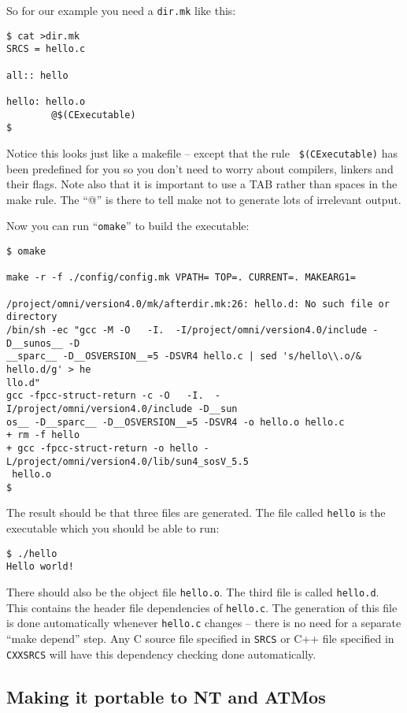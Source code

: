 \documentclass[11pt]{article}
\begin{document}
So for our example you need a {\tt dir.mk} like this:

\begin{verbatim}
$ cat >dir.mk
SRCS = hello.c

all:: hello

hello: hello.o
        @$(CExecutable)
$
\end{verbatim}

Notice this looks just like a makefile -- except that the rule {\tt
\$(CExecutable)} has been predefined for you so you don't need to worry about
compilers, linkers and their flags.  Note also that it is important to use a
TAB rather than spaces in the make rule.  The ``@'' is there to tell make not
to generate lots of irrelevant output.

Now you can run ``{\tt omake}'' to build the executable:

{\small
\begin{verbatim}
$ omake

make -r -f ./config/config.mk VPATH= TOP=. CURRENT=. MAKEARG1=

/project/omni/version4.0/mk/afterdir.mk:26: hello.d: No such file or directory
/bin/sh -ec "gcc -M -O   -I.  -I/project/omni/version4.0/include -D__sunos__ -D
__sparc__ -D__OSVERSION__=5 -DSVR4 hello.c | sed 's/hello\\.o/& hello.d/g' > he
llo.d"
gcc -fpcc-struct-return -c -O   -I.  -I/project/omni/version4.0/include -D__sun
os__ -D__sparc__ -D__OSVERSION__=5 -DSVR4 -o hello.o hello.c
+ rm -f hello 
+ gcc -fpcc-struct-return -o hello -L/project/omni/version4.0/lib/sun4_sosV_5.5
 hello.o 
$
\end{verbatim}
}

The result should be that three files are generated.  The file called
{\tt hello} is the executable which you should be able to run:

\begin{verbatim}
$ ./hello
Hello world!
\end{verbatim}

There should also be the object file {\tt hello.o}.  The third file is called
{\tt hello.d}.  This contains the header file dependencies of {\tt hello.c}.
The generation of this file is done automatically whenever {\tt hello.c}
changes -- there is no need for a separate ``make depend'' step.  Any C source
file specified in {\tt SRCS} or C++ file specified in {\tt CXXSRCS} will have
this dependency checking done automatically.

\subsection{Making it portable to NT and ATMos}
\end{document}
